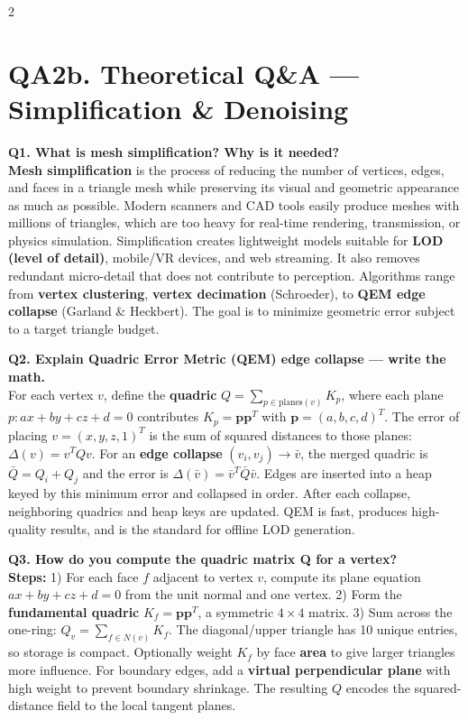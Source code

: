 \begin{paracol}{2}
\section*{QA2b. Theoretical Q\&A — Simplification \& Denoising}

\textbf{Q1. What is mesh simplification? Why is it needed?}\\
\textbf{Mesh simplification} is the process of reducing the number of vertices, edges, and faces in a triangle mesh while preserving its visual and geometric appearance as much as possible. Modern scanners and CAD tools easily produce meshes with millions of triangles, which are too heavy for real-time rendering, transmission, or physics simulation. Simplification creates lightweight models suitable for \textbf{LOD (level of detail)}, mobile/VR devices, and web streaming. It also removes redundant micro-detail that does not contribute to perception. Algorithms range from \textbf{vertex clustering}, \textbf{vertex decimation} (Schroeder), to \textbf{QEM edge collapse} (Garland \& Heckbert). The goal is to minimize geometric error subject to a target triangle budget.

\textbf{Q2. Explain Quadric Error Metric (QEM) edge collapse — write the math.}\\
For each vertex $v$, define the \textbf{quadric} $Q = \sum_{p \in \text{planes}(v)} K_p$, where each plane $p: ax+by+cz+d=0$ contributes $K_p = \mathbf{p}\mathbf{p}^T$ with $\mathbf{p}=(a,b,c,d)^T$. The error of placing $v=(x,y,z,1)^T$ is the sum of squared distances to those planes: $\Delta(v) = v^T Q v$. For an \textbf{edge collapse} $(v_i,v_j) \to \bar v$, the merged quadric is $\bar Q = Q_i + Q_j$ and the error is $\Delta(\bar v) = \bar v^T \bar Q \bar v$. Edges are inserted into a heap keyed by this minimum error and collapsed in order. After each collapse, neighboring quadrics and heap keys are updated. QEM is fast, produces high-quality results, and is the standard for offline LOD generation.

\textbf{Q3. How do you compute the quadric matrix Q for a vertex?}\\
\textbf{Steps:} 1) For each face $f$ adjacent to vertex $v$, compute its plane equation $ax+by+cz+d=0$ from the unit normal and one vertex. 2) Form the \textbf{fundamental quadric} $K_f = \mathbf{p}\mathbf{p}^T$, a symmetric $4\times 4$ matrix. 3) Sum across the one-ring: $Q_v = \sum_{f \in N(v)} K_f$. The diagonal/upper triangle has 10 unique entries, so storage is compact. Optionally weight $K_f$ by face \textbf{area} to give larger triangles more influence. For boundary edges, add a \textbf{virtual perpendicular plane} with high weight to prevent boundary shrinkage. The resulting $Q$ encodes the squared-distance field to the local tangent planes.


\end{paracol}
